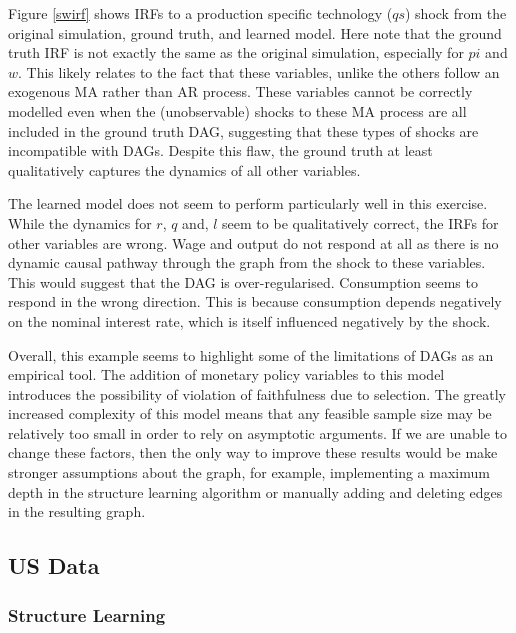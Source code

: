 \documentclass{article}
\begin{document}
Figure \ref{swirf} shows IRFs to a production specific technology ($qs$) shock from the original simulation, ground truth, and learned model. Here note that the ground truth IRF is not exactly the same as the original simulation, especially for $pi$ and $w$. This likely relates to the fact that these variables, unlike the others follow an exogenous MA rather than AR process. These variables cannot be correctly modelled even when the (unobservable) shocks to these MA process are all included in the ground truth DAG, suggesting that these types of shocks are incompatible with DAGs. Despite this flaw, the ground truth at least qualitatively captures the dynamics of all other variables.

The learned model does not seem to perform particularly well in this exercise. While the dynamics for $r$, $q$ and, $l$ seem to be qualitatively correct, the IRFs for other variables are wrong. Wage and output do not respond at all as there is no dynamic causal pathway through the graph from the shock to these variables. This would suggest that the DAG is over-regularised. Consumption seems to respond in the wrong direction. This is because consumption depends negatively on the nominal interest rate, which is itself influenced negatively by the shock. 

Overall, this example seems to highlight some of the limitations of DAGs as an empirical tool. The addition of monetary policy variables to this model introduces the possibility of violation of faithfulness due to selection. The greatly increased complexity of this model means that any feasible sample size may be relatively too small in order to rely on asymptotic arguments. If we are unable to change these factors, then the only way to improve these results would be make stronger assumptions about the graph, for example, implementing a maximum depth in the structure learning algorithm or manually adding and deleting edges in the resulting graph.

\subsection{US Data}

\subsubsection{Structure Learning}
\end{document}
